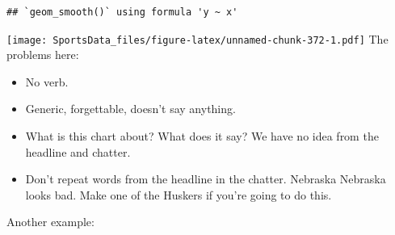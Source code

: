 \documentclass[
]{book}
\providecommand{\tightlist}{%
  \setlength{\itemsep}{0pt}\setlength{\parskip}{0pt}}
\begin{document}
\begin{verbatim}
## `geom_smooth()` using formula 'y ~ x'
\end{verbatim}

\texttt{[image: SportsData\_files/figure-latex/unnamed-chunk-372-1.pdf]}
The problems here:

\begin{itemize}
\tightlist
\item
  No verb.
\item
  Generic, forgettable, doesn't say anything.
\item
  What is this chart about? What does it say? We have no idea from the headline and chatter.
\item
  Don't repeat words from the headline in the chatter. Nebraska Nebraska looks bad. Make one of the Huskers if you're going to do this.
\end{itemize}

Another example:
\end{document}
